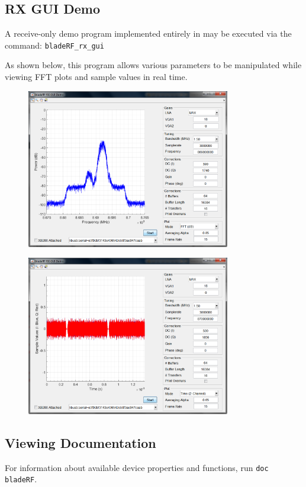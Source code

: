 {\newpage
\subsection{RX GUI Demo}
A receive-only demo program implemented entirely in \matlab may be executed via the command: \texttt{bladeRF\_rx\_gui}

As shown below, this program allows various parameters to be manipulated while viewing FFT plots and sample values in real time.

\begin{figure}[h]
  \centering
  \includegraphics[width=3.5in]{images/windows/matlab/rxgui-freq.png}
\end{figure}

\begin{figure}[h]
  \centering
  \includegraphics[width=3.5in]{images/windows/matlab/rxgui-time.png}
\end{figure}

\newpage
\subsection{Viewing Documentation}
For information about available device properties and functions, run \texttt{doc bladeRF}.

}
